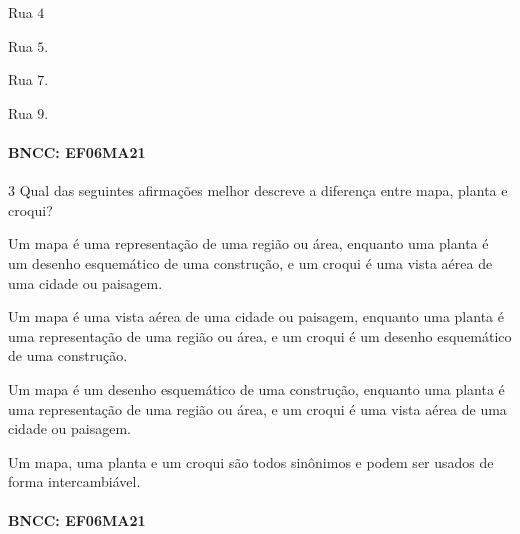 {\begin{escolha}
\item Rua $4$
\item Rua $5$.
\item Rua $7$.
\item Rua $9$.
\end{escolha}

\paragraph{BNCC: EF06MA21 }


\num{3}  Qual das seguintes afirmações melhor descreve a diferença entre mapa,
planta e croqui?

\begin{escolha}
\item
  Um mapa é uma representação de uma região ou área, enquanto uma planta
  é um desenho esquemático de uma construção, e um croqui é uma vista
  aérea de uma cidade ou paisagem.
\item
  Um mapa é uma vista aérea de uma cidade ou paisagem, enquanto uma
  planta é uma representação de uma região ou área, e um croqui é um
  desenho esquemático de uma construção.
\item
  Um mapa é um desenho esquemático de uma construção, enquanto uma
  planta é uma representação de uma região ou área, e um croqui é uma
  vista aérea de uma cidade ou paisagem.
\item
  Um mapa, uma planta e um croqui são todos sinônimos e podem ser usados
  de forma intercambiável.
\end{escolha}


\paragraph{BNCC: EF06MA21 }

}
